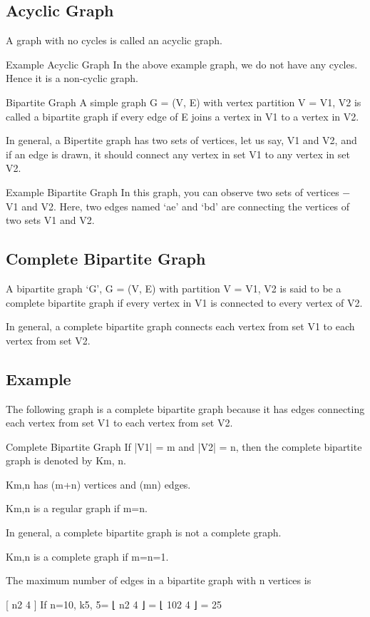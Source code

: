 \subsection{Acyclic Graph}
A graph with no cycles is called an acyclic graph.

Example
Acyclic Graph
In the above example graph, we do not have any cycles. Hence it is a non-cyclic graph.

Bipartite Graph
A simple graph G = (V, E) with vertex partition V = {V1, V2} is called a bipartite graph if every edge of E joins a vertex in V1 to a vertex in V2.

In general, a Bipertite graph has two sets of vertices, let us say, V1 and V2, and if an edge is drawn, it should connect any vertex in set V1 to any vertex in set V2.

Example
Bipartite Graph
In this graph, you can observe two sets of vertices − V1 and V2. Here, two edges named ‘ae’ and ‘bd’ are connecting the vertices of two sets V1 and V2.

\subsection{Complete Bipartite Graph}
A bipartite graph ‘G’, G = (V, E) with partition V = {V1, V2} is said to be a complete bipartite graph if every vertex in V1 is connected to every vertex of V2.

In general, a complete bipartite graph connects each vertex from set V1 to each vertex from set V2.

\subsection{Example}
The following graph is a complete bipartite graph because it has edges connecting each vertex from set V1 to each vertex from set V2.

Complete Bipartite Graph
If |V1| = m and |V2| = n, then the complete bipartite graph is denoted by Km, n.

Km,n has (m+n) vertices and (mn) edges.

Km,n is a regular graph if m=n.

In general, a complete bipartite graph is not a complete graph.

Km,n is a complete graph if m=n=1.

The maximum number of edges in a bipartite graph with n vertices is

[
n2
4
]
If n=10, k5, 5= ⌊
n2
4
⌋ = ⌊
102
4
⌋ = 25

